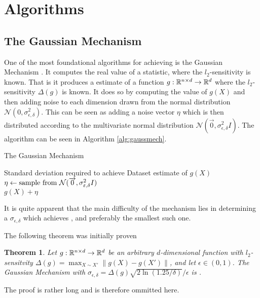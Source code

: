 \documentclass[a4paper,12pt]{article}
\newcommand{\Desc}[2]{\State \makebox[6em][l]{#1}#2}
\newtheorem{theorem}{Theorem}
\begin{document}
\section{Algorithms}
\subsection{The Gaussian Mechanism}
One of the most foundational algorithms for achieving 
\edp is the Gaussian Mechanism \cite{dpbasic}. It computes the real
value of a statistic, where the $l_2$-sensitivity is known.
That is it produces a \edp estimate of a function 
$g: \R^{n \times d} \rightarrow \R^{d}$ where the $l_2$-sensitivity $ \Delta(g) $ 
is known.
It does so by computing the value of $g(X)$ and then adding noise
to each dimension drawn from the normal distribution 
$\mathcal{N}(0, \sigma_{\epsilon,\delta}^2)$.
This can be seen as adding a noise vector $\eta$ which 
is then distributed according to
the multivariate normal distribution 
$\mathcal{N}(\overrightarrow{0}, \sigma_{\epsilon,\delta}^2I)$. 
The algorithm can be seen in Algorithm \ref{alg:gaussmech}.

\begin{algorithm}
\caption{The Gaussian Mechanism}\label{alg:gaussmech}
\begin{algorithmic}
    \Input
    \Desc{$\sigma_{\epsilon,\delta}$}{Standard deviation required to achieve \edp}
    \Desc{$X \in \R^{n \times d}$}{Dataset}
    \EndInput
    \Output
    \State\edp estimate of $g(X)$
    \EndOutput
    \State$\eta \gets \textnormal{sample from } \mathcal{N}(\overrightarrow{0}, \sigma_{\epsilon,\delta}^2I)$ \\
    \Return$g(X) + \eta$
\end{algorithmic}
\end{algorithm}
It is quite apparent that the main difficulty of the mechanism 
lies in determining a $\sigma_{\epsilon, \delta}$ which achieves
\edp, and preferably the smallest such one.

The following theorem was initially proven
\begin{theorem}\textnormal{\cite{dpbasic}}
\label{theo:gaussMech}
Let $g: \R^{n \times d} \rightarrow \R^{d}$ be an arbitrary 
$d$-dimensional function with $l_2$-sensitvity 
$ \Delta(g) = \max_{X \sim X'} \| g(X) - g(X') \|$, 
and let $\epsilon \in (0,1)$.
The Gaussian Mechanism with
$\sigma_{\epsilon, \delta} = \Delta(g)  \sqrt{2\ln(1.25/\delta)}/\epsilon$ 
is \edp.
\end{theorem}
The proof is rather long and is therefore ommitted here.
\end{document}
